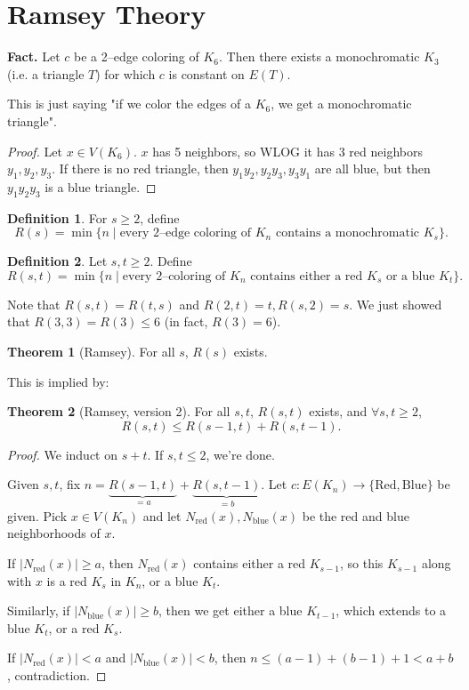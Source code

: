 \documentclass{article}
\theoremstyle{definition}
\newtheorem{theorem}{Theorem}[section]
\newtheorem{defn}{Definition}[section]
\begin{document}
\newpage

\section{Ramsey Theory}


\textbf{Fact.} Let $c$ be a 2--edge coloring of $K_6$. Then there exists a monochromatic $K_3$ (i.e. a triangle $T$) for which $c$ is constant on $E(T)$. 

This is just saying "if we color the edges of a $K_6$, we get a monochromatic triangle".
\begin{proof}
    Let $x \in V(K_6)$. $x$ has 5 neighbors, so WLOG it has 3 red neighbors $y_1,y_2,y_3$. If there is no red triangle, then $y_1y_2,y_2y_3,y_3y_1$ are all blue, but then $y_1y_2y_3$ is a blue triangle.
\end{proof}
\begin{defn}
    For $s\ge 2$, define $$R(s)= \min \{n \mid \text{every 2--edge coloring of }K_n \text{ contains a monochromatic }K_s\}.$$
\end{defn}
\begin{defn}
    Let $s,t \ge 2$. Define \[
    R(s,t) = \min \{n \mid \text{every 2--coloring of }K_n \text{ contains either a red }K_s \text{ or a blue }K_t\}.
    \]
\end{defn}
Note that $R(s,t)=R(t,s)$ and $R(2,t)=t, R(s,2)=s$. We just showed that $R(3,3)=R(3)\le 6$ (in fact, $R(3)=6$).
\begin{theorem}[Ramsey]
    For all $s$, $R(s)$ exists.
\end{theorem}
This is implied by:
\begin{theorem}[Ramsey, version 2]
    For all $s,t$, $R(s,t)$ exists, and $\forall s,t\ge 2$, \[
    R(s,t) \le R(s-1,t) + R(s,t-1).
    \]
\end{theorem}
\begin{proof}
    We induct on $s+t$. If $s,t\le 2$, we're done. 
    
    Given $s,t$, fix $n=\underbrace{R(s-1,t)}_{=a} +\underbrace{R(s,t-1)}_{=b}$. Let $c: E(K_n) \to \{\text{Red},\text{Blue}\}$ be given. Pick $x \in V(K_n)$ and let $N_{\text{red}}(x), N_{\text{blue}}(x)$ be the red and blue neighborhoods of $x$.
    \vspace{1mm}
    
    If $|N_{\text{red}}(x)| \ge a$, then $N_{\text{red}}(x)$ contains either a red $K_{s-1}$, so this $K_{s-1}$ along with $x$ is a red $K_s$ in $K_n$, or a blue $K_t$.
    \vspace{1mm}
    
    Similarly, if $|N_{\text{blue}}(x)| \ge b$, then we get either a blue $K_{t-1}$, which extends to a blue $K_t$, or a red $K_s$.
    \vspace{1mm}
    
    If $|N_{\text{red}}(x)|<a$ and $|N_{\text{blue}}(x)|<b$, then $n \le (a-1)+(b-1) + 1 <a+b$, contradiction.
\end{proof}
\end{document}
